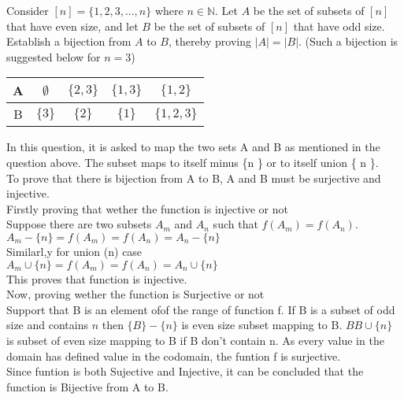 \documentclass[addpoints]{exam}
\begin{document}
\begin{questions}
\begin{solution}
    
  \end{solution}

\question[15] Consider $[n] = \{1,2,3,...,n\}$ where $n \in \mathbb{N}$. Let $A$ be the set of subsets of $[n]$ that have even size, and let $B$ be the set of subsets of $[n]$ that have odd size. Establish a bijection from $A$ to $B$, thereby proving $|A| = |B|$. (Such a bijection is suggested below for $n = 3$) 

\begin{center}

  \begin{tabular}{ |c || c | c | c |c |}
    \hline
 A & $\emptyset$ & $\{2,3\}$ & $\{1,3\}$ & $\{1,2\}$ \\ \hline
 B & $\{3\}$ & $\{2\}$ & $\{1\}$ & $\{1,2,3\}$\\\hline
\end{tabular}
\end{center}

  \begin{solution}
    In this question, it is asked to map the two sets A and B as mentioned in the question above. The subset maps to itself minus \{n \} or to itself union \{ n \}. \\
    To prove that there is bijection from A to B, A and B must be surjective and injective. \\
    Firstly proving that wether the function is injective or not \\
    Suppose there are two subsets $A_{m}$ and $A_{n}$ such that $f(A_{m}) = f(A_{n})$. \\
    $A_{m} - \{ n \} = f(A_{m})= f(A_{n}) = A_{n} - \{ n \}$ \\
    Similarl,y for union (n) case \\
    $A_{m} \cup \{ n \} = f(A_{m})= f(A_{n}) = A_{n} \cup \{ n \}$ \\
    This proves that function is injective. \\
    Now, proving wether the function is Surjective or not \\
    Support that B is an element ofof the range of function f. If B is a subset of odd size and contains $n$ then $\{B\} - \{n\} $ is even size subset mapping to B. $BB \cup \{ n \}$ is subset of even size mapping to B if B don't contain n. As every value in the domain has defined value in the codomain, the funtion f is surjective. \\
    Since funtion is both Sujective and Injective, it can be concluded that the function is Bijective from A to B.
    

\end{solution}
\end{questions}
\end{document}
